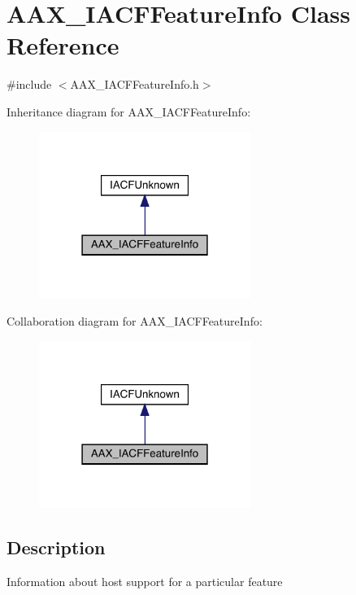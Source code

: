 \hypertarget{a01689}{}\section{A\+A\+X\+\_\+\+I\+A\+C\+F\+Feature\+Info Class Reference}
\label{a01689}


{\ttfamily \#include $<$A\+A\+X\+\_\+\+I\+A\+C\+F\+Feature\+Info.\+h$>$}



Inheritance diagram for A\+A\+X\+\_\+\+I\+A\+C\+F\+Feature\+Info\+:
\nopagebreak
\begin{figure}[H]
\begin{center}
\leavevmode
\includegraphics[width=195pt]{a01688}
\end{center}
\end{figure}


Collaboration diagram for A\+A\+X\+\_\+\+I\+A\+C\+F\+Feature\+Info\+:
\nopagebreak
\begin{figure}[H]
\begin{center}
\leavevmode
\includegraphics[width=195pt]{a01687}
\end{center}
\end{figure}


\subsection{Description}
Information about host support for a particular feature

